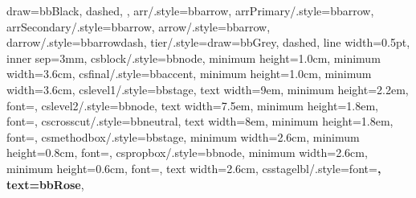 {{    draw=bbBlack,
    dashed,
  },
  arr/.style={bbarrow},
  arrPrimary/.style={bbarrow},
  arrSecondary/.style={bbarrow},
  arrow/.style={bbarrow},
  darrow/.style={bbarrowdash},
  tier/.style={draw=bbGrey, dashed, line width=0.5pt, inner sep=3mm},
  csblock/.style={bbnode, minimum height=1.0cm, minimum width=3.6cm},
  csfinal/.style={bbaccent, minimum height=1.0cm, minimum width=3.6cm},
  cslevel1/.style={bbstage, text width=9em, minimum height=2.2em, font=\small\rmfamily\bfseries},
  cslevel2/.style={bbnode, text width=7.5em, minimum height=1.8em, font=\scriptsize\rmfamily},
  cscrosscut/.style={bbneutral, text width=8em, minimum height=1.8em, font=\scriptsize\rmfamily},
  csmethodbox/.style={bbstage, minimum width=2.6cm, minimum height=0.8cm, font=\small\rmfamily\bfseries},
  cspropbox/.style={bbnode, minimum width=2.6cm, minimum height=0.6cm, font=\scriptsize\rmfamily, text width=2.6cm},
  csstagelbl/.style={font=\rmfamily\bfseries\small, text=bbRose},
}
